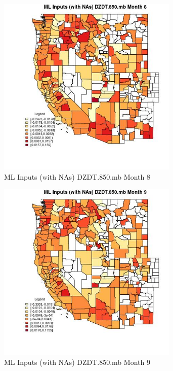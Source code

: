 \begin{figure} 
\centering  
\includegraphics[width=0.77\textwidth]{Code_Outputs/Report_ML_input_PM25_Step4_part_f_de_duplicated_aveswNAs_CountyDZDT850mbmedianMonth8.jpg} 
\caption{\label{fig:Report_ML_input_PM25_Step4_part_f_de_duplicated_aveswNAsCountyDZDT850mbmedianMonth8}ML Inputs (with NAs) DZDT.850.mb Month 8} 
\end{figure} 
 

\begin{figure} 
\centering  
\includegraphics[width=0.77\textwidth]{Code_Outputs/Report_ML_input_PM25_Step4_part_f_de_duplicated_aveswNAs_CountyDZDT850mbmedianMonth9.jpg} 
\caption{\label{fig:Report_ML_input_PM25_Step4_part_f_de_duplicated_aveswNAsCountyDZDT850mbmedianMonth9}ML Inputs (with NAs) DZDT.850.mb Month 9} 
\end{figure} 
 


